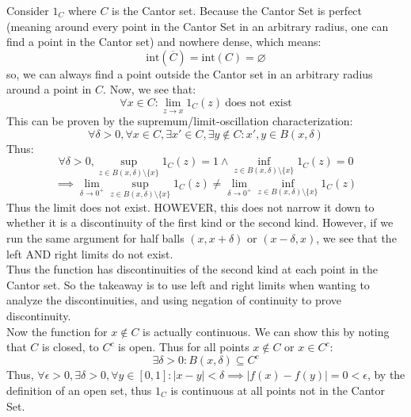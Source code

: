 \documentclass[10pt,letterpaper]{article} %
\begin{document}
Consider $1_C$ where $C$ is the Cantor set. Because the Cantor Set is perfect (meaning around every point in the Cantor Set in an arbitrary radius, one can find a point in the Cantor set) and nowhere dense, which means:
\begin{equation*}
\text{int}(\overline{C}) = \text{int}(C) = \varnothing
\end{equation*}
so, we can always find a point outside the Cantor set in an arbitrary radius around a point in $C$. Now, we see that:
\begin{equation*}
\forall x \in C: \lim_{z \xrightarrow{} x}1_C(z) \ \text{does not exist}
\end{equation*}
This can be proven by the supremum/limit-oscillation characterization:
\begin{equation*}
\forall \delta > 0, \forall x \in C, \exists x' \in C, \exists y \notin C: x', y \in B(x, \delta)
\end{equation*}
Thus:
\begin{equation*}
\forall \delta > 0, \sup_{z \in B(x, \delta)\setminus \{x\}}1_C(z) = 1 \land \inf_{z \in B(x, \delta)\setminus \{x\}}1_C(z) = 0
\end{equation*}
\begin{equation*}
\implies \lim_{\delta \xrightarrow{} 0^+}\sup_{z \in B(x, \delta)\setminus \{x\}}1_C(z) \neq \lim_{\delta \xrightarrow{} 0^+}\inf_{z \in B(x, \delta)\setminus \{x\}}1_C(z)
\end{equation*}
Thus the limit does not exist. HOWEVER, this does not narrow it down to whether it is a discontinuity of the first kind or the second kind. However, if we run the same argument for half balls $(x, x+\delta)$ or $(x-\delta, x)$, we see that the left AND right limits do not exist.\\

Thus the function has discontinuities of the second kind at each point in the Cantor set. So the takeaway is to use left and right limits when wanting to analyze the discontinuities, and using negation of continuity to prove discontinuity.\\

Now the function for $x \notin C$ is actually continuous. We can show this by noting that $C$ is closed, to $C^c$ is open. Thus for all points $x \notin C$ or $x \in C^c$:
\begin{equation*}
\exists \delta > 0: B(x, \delta) \subseteq C^c
\end{equation*}
Thus, $\forall \epsilon > 0, \exists \delta > 0, \forall y \in [0, 1]: |x-y| < \delta \implies |f(x) -f(y)| = 0 < \epsilon$, by the definition of an open set, thus $1_C$ is continuous at all points not in the Cantor Set.\\
\end{document}
